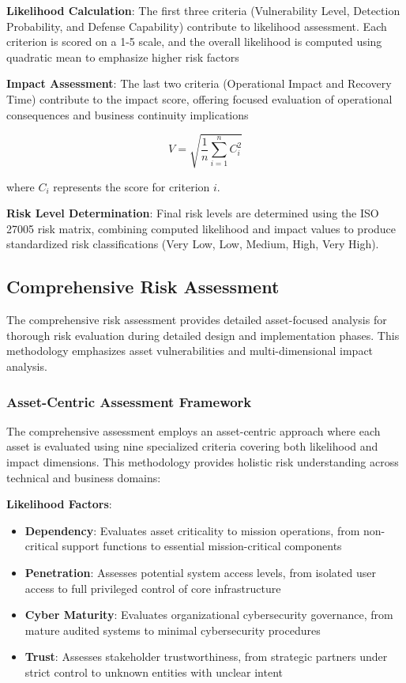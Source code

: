 \documentclass[binding=0.6cm]{sapthesis}
\begin{document}
\textbf{Likelihood Calculation}: The first three criteria (Vulnerability Level, Detection Probability, and Defense Capability) contribute to likelihood assessment. Each criterion is scored on a 1-5 scale, and the overall likelihood is computed using quadratic mean to emphasize higher risk factors


\textbf{Impact Assessment}: The last two criteria (Operational Impact and Recovery Time) contribute to the impact score, offering focused evaluation of operational consequences and business continuity implications

$$V = \sqrt{\frac{1}{n}\sum_{i=1}^{n} C_i^2}$$

where $C_i$ represents the score for criterion $i$.


\textbf{Risk Level Determination}: Final risk levels are determined using the ISO 27005 risk matrix, combining computed likelihood and impact values to produce standardized risk classifications (Very Low, Low, Medium, High, Very High).

\subsection{Comprehensive Risk Assessment}

The comprehensive risk assessment provides detailed asset-focused analysis for thorough risk evaluation during detailed design and implementation phases. This methodology emphasizes asset vulnerabilities and multi-dimensional impact analysis.

\subsubsection{Asset-Centric Assessment Framework}

The comprehensive assessment employs an asset-centric approach where each asset is evaluated using nine specialized criteria covering both likelihood and impact dimensions. This methodology provides holistic risk understanding across technical and business domains:

\textbf{Likelihood Factors}:
\begin{itemize}
    \item \textbf{Dependency}: Evaluates asset criticality to mission operations, from non-critical support functions to essential mission-critical components
    \item \textbf{Penetration}: Assesses potential system access levels, from isolated user access to full privileged control of core infrastructure
    \item \textbf{Cyber Maturity}: Evaluates organizational cybersecurity governance, from mature audited systems to minimal cybersecurity procedures
    \item \textbf{Trust}: Assesses stakeholder trustworthiness, from strategic partners under strict control to unknown entities with unclear intent
\end{itemize}
\end{document}
